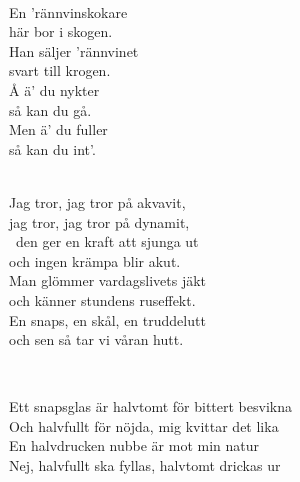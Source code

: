  \\       
\author{Text: Lars T. Johansson, Ehrling Eliasson }

\songtext{}En 'rännvinskokare \\
här bor i skogen. \\
Han säljer 'rännvinet \\
svart till krogen. \\
Å ä' du nykter \\
så kan du gå. \\
Men ä' du fuller \\
så kan du int'. \\


 \\       

\songtext{}
Jag tror, jag tror på akvavit, \\
jag tror, jag tror på dynamit, \\\
den ger en kraft att sjunga ut \\
och ingen krämpa blir akut. \\
Man glömmer vardagslivets jäkt \\
och känner stundens ruseffekt. \\
En snaps, en skål, en truddelutt \\
och sen så tar vi våran hutt.

\newpage 


 \\       
\author{Text: Quiz och Jacke}

\songtext{}
Ett snapsglas är halvtomt för bittert besvikna \\
Och halvfullt för nöjda, mig kvittar det lika \\
En halvdrucken nubbe är mot min natur \\
Nej, halvfullt ska fyllas, halvtomt drickas ur 

 \\



\newpage 


